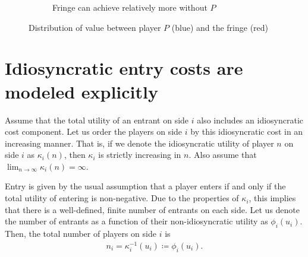 \documentclass[a4paper]{article}
\begin{document}
\begin{figure}
\begin{subfigure}[b]{0.45\textwidth}
        \caption{Fringe can achieve relatively more without $P$}
    \end{subfigure}
    \caption{Distribution of value between player $P$ (blue) and the fringe (red)}
    \label{fig:non_indispensable}
\end{figure}


\section{Idiosyncratic entry costs are modeled explicitly}
\label{sec:explicit_entry_costs}

Assume that the total utility of an entrant on side $i$ also includes an idiosyncratic cost component.
Let us order the players on side $i$ by this idiosyncratic cost in an increasing manner.
That is, if we denote the idiosyncratic utility of player $n$ on side $i$ as $\kappa_i(n)$, then $\kappa_i$ is strictly increasing in $n$.
Also assume that $\lim_{n \to \infty} \kappa_i(n) = \infty$.

Entry is given by the usual assumption that a player enters if and only if the total utility of entering is non-negative.
Due to the properties of $\kappa_i$, this implies that there is a well-defined, finite number of entrants on each side.
Let us denote the number of entrants as a function of their non-idiosyncratic utility as $\phi_i(u_i)$.
Then, the total number of players on side $i$ is 
\begin{align*}
    n_i = \kappa_i^{-1}(u_i) \coloneqq \phi_i(u_i).
\end{align*}
\end{document}

